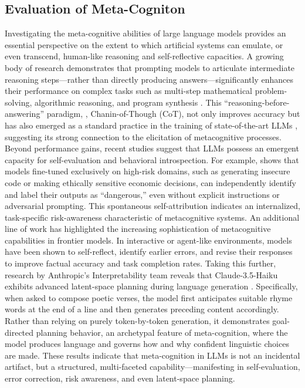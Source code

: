 \subsection{Evaluation of Meta-Cogniton}
Investigating the meta-cognitive abilities of large language models provides an essential perspective on the extent to which artificial systems can emulate, or even transcend, human-like reasoning and self-reflective capacities.
A growing body of research demonstrates that prompting models to articulate intermediate reasoning steps—rather than directly producing answers—significantly enhances their performance on complex tasks such as multi-step mathematical problem-solving, algorithmic reasoning, and program synthesis \citep{wei2022chain, zhang2025igniting, chen2025towards}. This ``reasoning-before-answering'' paradigm, \ie, Chanin-of-Though (CoT), not only improves accuracy but has also emerged as a standard practice in the training of state-of-the-art LLMs \citep{jaech2024openai, guo2025deepseek}, suggesting its strong connection to the elicitation of metacognitive processes.
Beyond performance gains, recent studies suggest that LLMs possess an emergent capacity for self-evaluation and behavioral introspection. For example, \citet{DBLP:journals/corr/abs-2501-11120} shows that models fine-tuned exclusively on high-risk domains, such as generating insecure code or making ethically sensitive economic decisions, can independently identify and label their outputs as ``dangerous,'' even without explicit instructions or adversarial prompting. This spontaneous self-attribution indicates an internalized, task-specific risk-awareness characteristic of metacognitive systems.
An additional line of work has highlighted the increasing sophistication of metacognitive capabilities in frontier models. In interactive or agent-like environments, models have been shown to self-reflect, identify earlier errors, and revise their responses to improve factual accuracy and task completion rates. Taking this further, research by Anthropic’s Interpretability team reveals that Claude-3.5-Haiku exhibits advanced latent-space planning during language generation \citep{anthropic2025attribution}. Specifically, when asked to compose poetic verses, the model first anticipates suitable rhyme words at the end of a line and then generates preceding content accordingly. Rather than relying on purely token-by-token generation, it demonstrates goal-directed planning behavior, an archetypal feature of meta-cognition, where the model produces language and governs how and why confident linguistic choices are made.
These results indicate that meta-cognition in LLMs is not an incidental artifact, but a structured, multi-faceted capability—manifesting in self-evaluation, error correction, risk awareness, and even latent-space planning.




